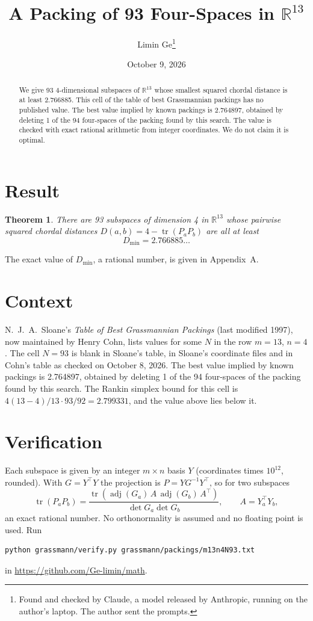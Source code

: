 \documentclass[11pt,a4paper]{article}
\title{A Packing of 93 Four-Spaces in $\mathbb{R}^{13}$}
\author{Limin Ge\thanks{Found and checked by Claude, a model released by Anthropic, running on the author's laptop. The author sent the prompts.}}
\date{October 9, 2026}
\newtheorem*{theorem}{Theorem}
\begin{document}
\maketitle
\begin{abstract}
We give 93 4-dimensional subspaces of $\mathbb{R}^{13}$ whose smallest squared chordal distance is at least 2.766885. This cell of the table of best Grassmannian packings has no published value. The best value implied by known packings is 2.764897, obtained by deleting 1 of the 94 four-spaces of the packing found by this search. The value is checked with exact rational arithmetic from integer coordinates. We do not claim it is optimal.
\end{abstract}

\section{Result}
\begin{theorem}
There are 93 subspaces of dimension 4 in $\mathbb{R}^{13}$ whose pairwise squared chordal distances $D(a,b) = 4 - \operatorname{tr}(P_aP_b)$ are all at least
\[ D_{\min} = 2.766885\ldots \]
\end{theorem}
The exact value of $D_{\min}$, a rational number, is given in Appendix~A.


\section{Context}
N.~J.~A.~Sloane's \emph{Table of Best Grassmannian Packings} (last modified 1997), now maintained by Henry Cohn, lists values for some $N$ in the row $m=13$, $n=4$. The cell $N=93$ is blank in Sloane's table, in Sloane's coordinate files and in Cohn's table as checked on October 8, 2026. The best value implied by known packings is 2.764897, obtained by deleting 1 of the 94 four-spaces of the packing found by this search. The Rankin simplex bound for this cell is $4(13-4)/13\cdot 93/92 = 2.799331$, and the value above lies below it.


\section{Verification}
Each subspace is given by an integer $m\times n$ basis $Y$ (coordinates times $10^{12}$, rounded). With $G=Y^\top Y$ the projection is $P=YG^{-1}Y^\top$, so for two subspaces
\[ \operatorname{tr}(P_aP_b)=\frac{\operatorname{tr}(\operatorname{adj}(G_a)\,A\,\operatorname{adj}(G_b)\,A^\top)}{\det G_a\det G_b},\qquad A=Y_a^\top Y_b, \]
an exact rational number. No orthonormality is assumed and no floating point is used. Run
\begin{verbatim}
python grassmann/verify.py grassmann/packings/m13n4N93.txt
\end{verbatim}
in \url{https://github.com/Ge-limin/math}.
\end{document}
